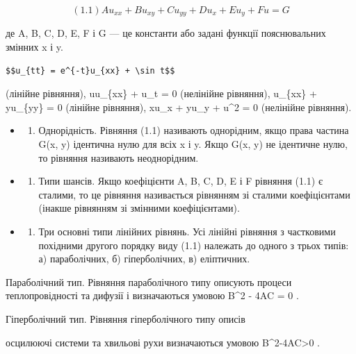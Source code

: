 \documentclass[
  ukrainian,
]{article}
\providecommand{\tightlist}{%
  \setlength{\itemsep}{0pt}\setlength{\parskip}{0pt}}
\begin{document}
\[(1.1) Au_{xx} + Bu_{xy} + Cu_{yy} + Du_x + Eu_y + Fu = G\]

де A, B, C, D, E, F і G --- це константи або задані функції
пояснювальних змінних x і y.

\begin{verbatim}
$$u_{tt} = e^{-t}u_{xx} + \sin t$$
\end{verbatim}

(лінійне рівняння), uu\_\{xx\} + u\_t = 0 (нелінійне рівняння),
u\_\{xx\} + yu\_\{yy\} = 0 (лінійне рівняння), xu\_x + yu\_y + u\^{}2 =
0 (нелінійне рівняння).

\begin{itemize}
\tightlist
\item
  \begin{enumerate}
  \def\labelenumi{\arabic{enumi}.}
  \setcounter{enumi}{3}
  \tightlist
  \item
    Однорідність. Рівняння (1.1) називають однорідним, якщо права
    частина G(x, y) ідентична нулю для всіх x і y. Якщо G(x, y) не
    ідентичне нулю, то рівняння називають неоднорідним.
  \end{enumerate}
\item
  \begin{enumerate}
  \def\labelenumi{\arabic{enumi}.}
  \setcounter{enumi}{4}
  \tightlist
  \item
    Типи шансів. Якщо коефіцієнти A, B, C, D, E і F рівняння (1.1) є
    сталими, то це рівняння називається рівнянням зі сталими
    коефіцієнтами (інакше рівнянням зі змінними коефіцієнтами).
  \end{enumerate}
\item
  \begin{enumerate}
  \def\labelenumi{\arabic{enumi}.}
  \setcounter{enumi}{5}
  \tightlist
  \item
    Три основні типи лінійних рівнянь. Усі лінійні рівняння з частковими
    похідними другого порядку виду (1.1) належать до одного з трьох
    типів: а) параболічних, б) гіперболічних, в) еліптичних.
  \end{enumerate}
\end{itemize}

Параболічний тип. Рівняння параболічного типу описують процеси
теплопровідності та дифузії і визначаються умовою B\^{}2 - 4AC = 0 .

Гіперболічний тип. Рівняння гіперболічного типу описів

осцилюючі системи та хвильові рухи визначаються умовою
B\^{}2-4AC\textgreater0 .
\end{document}
